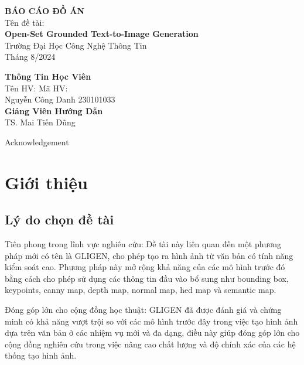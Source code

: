 \documentclass[12pt]{report}
\newcommand\tab[1][1cm]{\hspace*{#1}}
\begin{document}
\thispagestyle{empty}
\begin{center}

	\vspace*{3cm}
	{\bf \LARGE BÁO CÁO ĐỒ ÁN}\\
	\vspace*{2cm}
	Tên đề tài:\\
	{\bf \Large Open-Set Grounded Text-to-Image Generation}\\
	\vspace{3cm}
	{\Large Trường Đại Học Công Nghệ Thông Tin}\\
	\vspace{5cm}
	{\Large Tháng 8/2024}
\end{center}

\newpage
\vspace*{5cm}
\begin{center}
	{\bf \Large Thông Tin Học Viên}\\
	Tên HV: \tab Mã HV:\\
	Nguyễn Công Danh \tab 230101033\\
	\vspace{5cm}
	{\bf \Large Giảng Viên Hướng Dẫn}\\
	TS. Mai Tiến Dũng
\end{center}

\newpage
 {Acknowledgement}

\tableofcontents
\listoffigures
\listoftables
\chapter{Giới thiệu}
\section{Lý do chọn đề tài}
Tiên phong trong lĩnh vực nghiên cứu:
Đề tài này liên quan đến một phương pháp mới có tên là GLIGEN,
cho phép tạo ra hình ảnh từ văn bản có tính năng kiểm soát cao.
Phương pháp này mở rộng khả năng của các mô hình trước đó bằng cách cho phép sử dụng các thông tin đầu vào
bổ sung như bounding box, keypoints, canny map, depth map, normal map, hed map và semantic map.

Đóng góp lớn cho cộng đồng học thuật:
GLIGEN đã được đánh giá và chứng minh có khả năng vượt trội so với các mô hình trước đây
trong việc tạo hình ảnh dựa trên văn bản ở các nhiệm vụ mới và đa dạng,
điều này giúp đóng góp lớn cho cộng đồng nghiên cứu trong việc nâng cao chất lượng
và độ chính xác của các hệ thống tạo hình ảnh.
\end{document}
